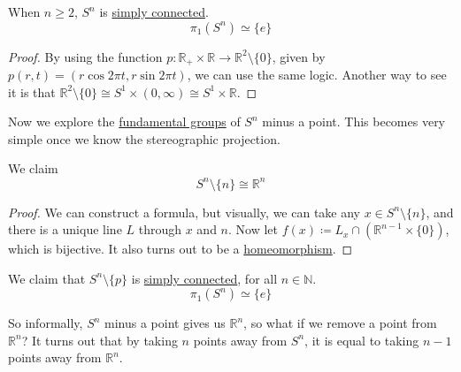 	\begin{theorem}
	  \label{thm:fundamental-groups-of-sn-for-ngeq2}
		When $n \geq 2$, $S^n$ is \hyperref[def:simply-connected]{simply connected}. 
		\begin{equation}
			\pi_1 (S^n) \simeq \{e\}
		\end{equation}
	\end{theorem}
	\begin{proof}
    By using the function $p: \mathbb{R}_+ \times \mathbb{R} \to \mathbb{R}^2 \setminus \{0\}$, given by $p(r, t) = (r \cos{2 \pi t}, r \sin{2 \pi t})$, we can use the same logic. Another way to see it is that $\mathbb{R}^2 \setminus \{0\} \cong S^1 \times (0, \infty) \cong S^1 \times \mathbb{R}$. 
	\end{proof}
	  
  Now we explore the \hyperref[def:fundamental-group]{fundamental groups} of $S^n$ minus a point. This becomes very simple once we know the stereographic projection. 

  \begin{theorem}
    \label{thm:stereographic-projection}
    We claim 
    \begin{equation}
      S^n \setminus \{n\} \cong \mathbb{R}^{n}
    \end{equation}
  \end{theorem}
  \begin{proof}
    We can construct a formula, but visually, we can take any $x \in S^n \setminus \{n\}$, and there is a unique line $L$ through $x$ and $n$. Now let $f(x) \coloneqq L _x \cap (\mathbb{R}^{n-1} \times \{0\})$, which is bijective. It also turns out to be a \hyperref[pst-def:homeomorphism]{homeomorphism}. 
  \end{proof}

  \begin{corollary}
    \label{thm:fundamental-groups-of-sn-minus-a-point}
    We claim that $S^n \setminus \{p\}$ is \hyperref[def:simply-connected]{simply connected}, for all $n \in \mathbb{N}$. 
    \begin{equation}
      \pi_1 (S^n) \simeq \{e\}
    \end{equation}
  \end{corollary}

  So informally, $S^n$ minus a point gives us $\mathbb{R}^n$, so what if we remove a point from $\mathbb{R}^n$? It turns out that by taking $n$ points away from $S^n$, it is equal to taking $n-1$ points away from $\mathbb{R}^n$. 

